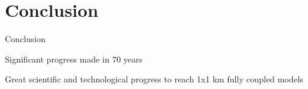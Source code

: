 \section{Conclusion}

\begin{frame}{Conclusion}
  \begin{wideitemize}
    \item Significant progress made in 70 years
    \item Great scientific and technological progress to reach 1x1 km fully coupled models
  \end{wideitemize}
\end{frame}
